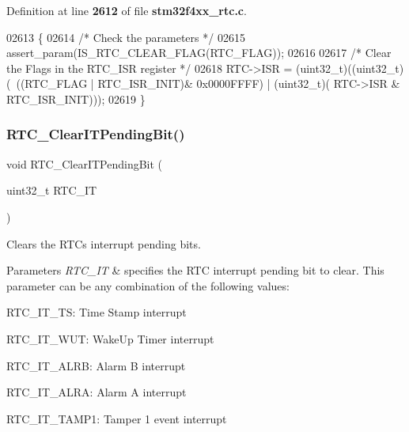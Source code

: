 Definition at line \textbf{ 2612} of file \textbf{ stm32f4xx\+\_\+rtc.\+c}.


\begin{DoxyCode}
02613 \{
02614   \textcolor{comment}{/* Check the parameters */}
02615   assert_param(IS_RTC_CLEAR_FLAG(RTC\_FLAG));
02616 
02617   \textcolor{comment}{/* Clear the Flags in the RTC\_ISR register */}
02618   RTC->ISR = (uint32\_t)((uint32\_t)(~((RTC\_FLAG | RTC_ISR_INIT)& 0x0000FFFF) | (uint32\_t)(
      RTC->ISR & RTC_ISR_INIT)));  
02619 \}
\end{DoxyCode}
\mbox{\label{group__RTC__Group13_gacac6accc75ae54f1b799fa8e7e83ccdb}} 
\subsubsection{R\+T\+C\+\_\+\+Clear\+I\+T\+Pending\+Bit()}
{\footnotesize\ttfamily void R\+T\+C\+\_\+\+Clear\+I\+T\+Pending\+Bit (\begin{DoxyParamCaption}\item[{uint32\+\_\+t}]{R\+T\+C\+\_\+\+IT }\end{DoxyParamCaption})}



Clears the R\+TC\textquotesingle{}s interrupt pending bits. 


\begin{DoxyParams}{Parameters}
{\em R\+T\+C\+\_\+\+IT} & specifies the R\+TC interrupt pending bit to clear. This parameter can be any combination of the following values\+: \begin{DoxyItemize}
\item R\+T\+C\+\_\+\+I\+T\+\_\+\+TS\+: Time Stamp interrupt \item R\+T\+C\+\_\+\+I\+T\+\_\+\+W\+UT\+: Wake\+Up Timer interrupt \item R\+T\+C\+\_\+\+I\+T\+\_\+\+A\+L\+RB\+: Alarm B interrupt \item R\+T\+C\+\_\+\+I\+T\+\_\+\+A\+L\+RA\+: Alarm A interrupt \item R\+T\+C\+\_\+\+I\+T\+\_\+\+T\+A\+M\+P1\+: Tamper 1 event interrupt \end{DoxyItemize}
\\
\hline
\end{DoxyParams}

